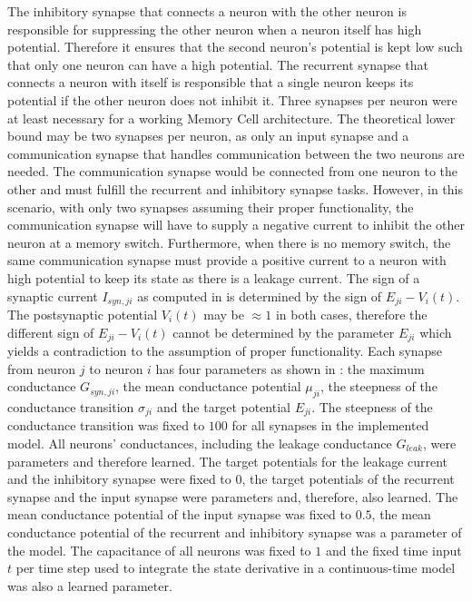 \documentclass[draft,final]{vutinfth} %
\begin{document}
    The inhibitory synapse that connects a neuron with the other neuron is responsible for suppressing the other neuron when a neuron itself has high potential. Therefore it ensures that the second neuron's potential is kept low such that only one neuron can have a high potential.
    The recurrent synapse that connects a neuron with itself is responsible that a single neuron keeps its potential if the other neuron does not inhibit it.
    Three synapses per neuron were at least necessary for a working Memory Cell architecture.
    The theoretical lower bound may be two synapses per neuron, as only an input synapse and a communication synapse that handles communication between the two neurons are needed.
    The communication synapse would be connected from one neuron to the other and must fulfill the recurrent and inhibitory synapse tasks.
    However, in this scenario, with only two synapses assuming their proper functionality, the communication synapse will have to supply a negative current to inhibit the other neuron at a memory switch.
    Furthermore, when there is no memory switch, the same communication synapse must provide a positive current to a neuron with high potential to keep its state as there is a leakage current.
    The sign of a synaptic current $I_{syn,ji}$ as computed in  is determined by the sign of $E_{ji} - V_i(t)$.
    The postsynaptic potential $V_i(t)$ may be $\approx 1$ in both cases, therefore the different sign of $E_{ji} - V_i(t)$ cannot be determined by the parameter $E_{ji}$ which yields a contradiction to the assumption of proper functionality.
    Each synapse from neuron $j$ to neuron $i$ has four parameters as shown in : the maximum conductance $G_{syn,ji}$, the mean conductance potential $\mu_{ji}$, the steepness of the conductance transition $\sigma_{ji}$ and the target potential $E_{ji}$.
    The steepness of the conductance transition was fixed to $100$ for all synapses in the implemented model.
    All neurons' conductances, including the leakage conductance $G_{leak}$, were parameters and therefore learned.
    The target potentials for the leakage current and the inhibitory synapse were fixed to $0$, the target potentials of the recurrent synapse and the input synapse were parameters and, therefore, also learned.
    The mean conductance potential of the input synapse was fixed to $0.5$, the mean conductance potential of the recurrent and inhibitory synapse was a parameter of the model.
    The capacitance of all neurons was fixed to $1$ and the fixed time input $t$ per time step used to integrate the state derivative in a continuous-time model was also a learned parameter.
\end{document}
